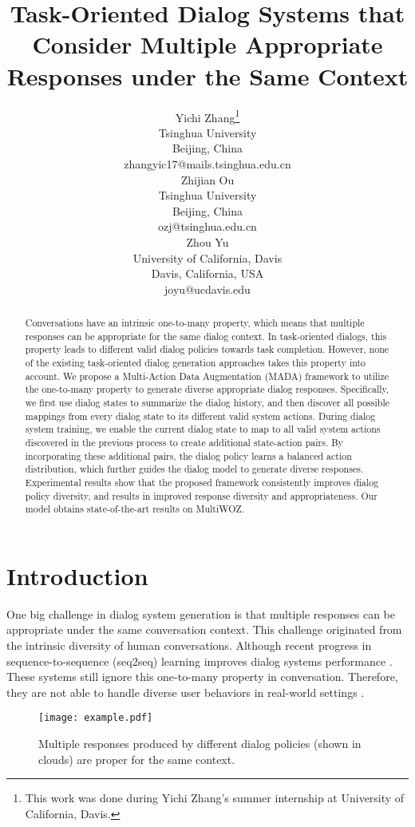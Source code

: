 \documentclass[letterpaper]{article} \usepackage{aaai20}  \usepackage{times}  \usepackage{helvet} \usepackage{courier}  \usepackage[hyphens]{url}  \usepackage{graphicx} \urlstyle{rm} \def\UrlFont{\rm}  \usepackage{graphicx}  \frenchspacing  \setlength{\pdfpagewidth}{8.5in}  \setlength{\pdfpageheight}{11in}  \usepackage{multirow}
\title{Task-Oriented Dialog Systems that Consider Multiple Appropriate Responses under the Same Context}
\author{Yichi Zhang\thanks{This work was done during Yichi Zhang's summer  internship at University of California, Davis.}\\
	Tsinghua University \\
	Beijing, China  \\
	{zhangyic17@mails.tsinghua.edu.cn} \\\And
	Zhijian Ou \\
	Tsinghua University \\
	Beijing, China\\
	{ozj@tsinghua.edu.cn} \\\And
	Zhou Yu \\
	University of California, Davis \\
	Davis, California, USA \\
	{joyu@ucdavis.edu} \\}
\begin{document}
	
	\maketitle
	
	\begin{abstract}
		Conversations have an intrinsic one-to-many property, which means that multiple responses can be appropriate for the same dialog context. In task-oriented dialogs, this property leads to different valid dialog policies towards task completion. However, none of the existing task-oriented dialog generation approaches takes this property into account. 
		We propose a Multi-Action Data Augmentation (MADA) framework to utilize the one-to-many property to generate diverse appropriate dialog responses. 
		Specifically, we first use dialog states to summarize the dialog history, and then discover all possible mappings from every dialog state to its different valid system actions.
		During dialog system training, we enable the current dialog state to map to all valid system actions discovered in the previous process to create additional state-action pairs.
		By incorporating these additional pairs, the dialog policy learns a balanced action distribution, which further guides the dialog model to generate diverse responses. 
Experimental results show that the proposed framework consistently improves dialog policy diversity, and results in improved response diversity and appropriateness. Our model obtains  state-of-the-art results on MultiWOZ. 
		
	\end{abstract}
	
	\section{Introduction}
	\label{intro}
	One big challenge in dialog system generation is that multiple responses can be appropriate under the same conversation context. This challenge originated from the intrinsic diversity of human conversations.
	Although recent progress in sequence-to-sequence (seq2seq) learning \cite{sutskever2014sequence} improves dialog systems performance \cite{serban2017hierarchical,wen2017network,lei2018sequicity}. These systems still ignore this one-to-many property in conversation. Therefore, they are not able to handle diverse user behaviors in real-world settings \cite{li2016diversity,rajendran2018learning}.
	
	
	\begin{figure}[t]
		\centering
		\texttt{[image: example.pdf]} 
		\caption{Multiple responses produced by different dialog policies (shown in clouds) are proper for the same context. }
		\label{example}
	\end{figure}
	
\end{document}
